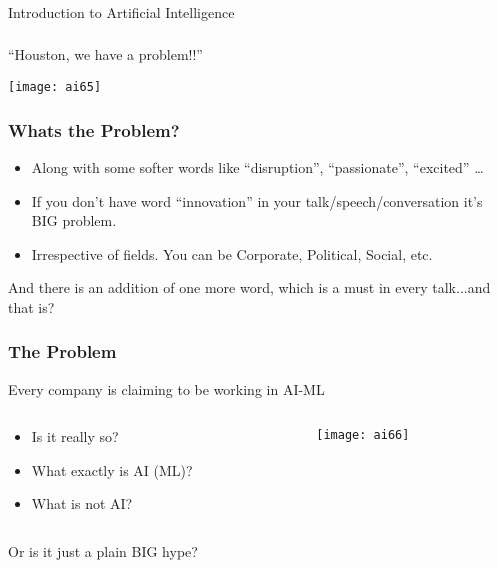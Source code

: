 \begin{frame}[fragile]\frametitle{}
\begin{center}
{\Large Introduction to Artificial Intelligence}
\end{center}
\end{frame}
 
\begin{frame}[fragile]\frametitle{}
\begin{center}
{\Large ``Houston, we have a problem!!''}
\end{center}


			\begin{center}
			\texttt{[image: ai65]}
			\end{center}
			
\end{frame}

\begin{frame}[fragile]\frametitle{Whats the Problem?}
\begin{itemize}
\item Along with some softer words like ``disruption'', ``passionate'', ``excited'' \ldots
\item If you don't have word ``innovation'' in your talk/speech/conversation it's  BIG problem. 
\item Irrespective of fields. You can be Corporate, Political, Social, etc.
\end{itemize}


And there is an addition of one more word,  which is a must in every talk...and that is?


\end{frame}

\begin{frame}[fragile]\frametitle{The Problem}
Every company is claiming to be working in AI-ML

\begin{columns}
    \begin{column}[T]{0.6\linewidth}

\begin{itemize}
\item Is it really so?
\item What exactly is AI (ML)?
\item What is not AI?
\end{itemize}

    \end{column}
    \begin{column}[T]{0.4\linewidth}

			\begin{center}
			\texttt{[image: ai66]}
			\end{center}
			
    \end{column}
  \end{columns}
  
Or is it just a plain BIG hype?
\end{frame}


